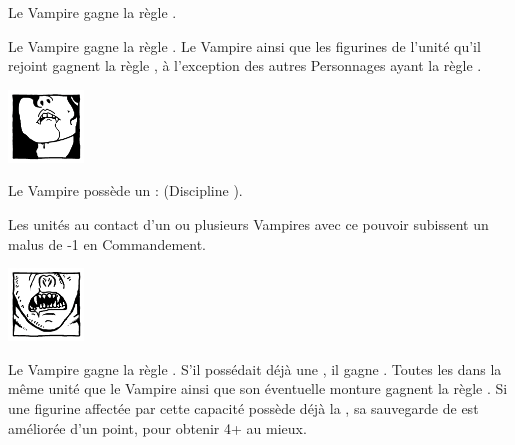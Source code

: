 \begin{multicols}{2}
 Le Vampire gagne la règle .

 Le Vampire gagne la règle \awaken{\zombies{}, \direwolves{}, \batswarms{}, \greatbats{}}. Le Vampire ainsi que les figurines de l'unité qu'il rejoint gagnent la règle \swiftstride{}, à l'exception des autres Personnages ayant la règle \vampiric{}.

\endpricelist

\begin{center}\includegraphics[width=2cm]{pics/logo_lamia.png}\end{center}
\vspace*{-1.2cm}

\startpricelist

 Le Vampire possède un  : \lustspellfour{} (Discipline \lust{}).

 Les unités au contact d'un ou plusieurs Vampires avec ce pouvoir subissent un malus de -1 en Commandement.

\endpricelist
\columnbreak

\begin{center}\includegraphics[width=2cm]{pics/logo_strigoi.png}\end{center}
\vspace*{-1.45cm} %
\vspace*{-0.2cm} %
\startpricelist

 Le Vampire gagne la règle . S'il possédait déjà une \regeneration{}, il gagne . Toutes les \ghouls{} dans la même unité que le Vampire ainsi que son éventuelle monture gagnent la règle . Si une figurine affectée par cette capacité possède déjà la \regeneration{}, sa sauvegarde de \regeneration{} est améliorée d'un point, pour obtenir 4+ au mieux.


\end{multicols}
